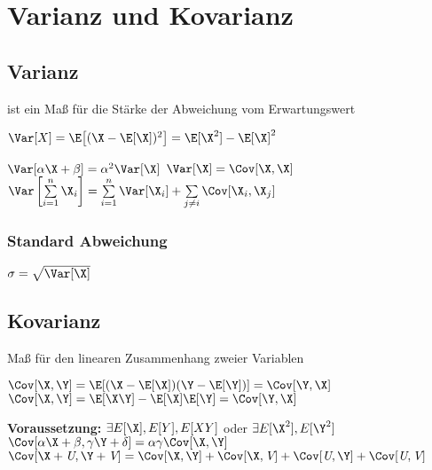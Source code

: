 \documentclass[german,color,6pt]{latex4ei/latex4ei_sheet}
\begin{document}


\section{Varianz und Kovarianz}
\begin{sectionbox}
\subsection{Varianz}
	ist ein Maß für die Stärke der Abweichung vom Erwartungswert
	\begin{emphbox}
		$\Var [X] = \E \big[(\X - \E[\X])^2\big] = \E[\X^2] - \E[\X]^2$
	\end{emphbox}
	$\Var [ \alpha \X + \beta] = \alpha^2 \Var [\X]$ \hfill $\Var [\X] = \Cov [\X,\X]$\\[0.5em]
	$\Var \left[\sum \limits_{i=1}^n \X_i \right] = \sum \limits_{i=1}^{n} \Var [\X_i] + \sum\limits_{j \not= i} \Cov[\X_i, \X_j]$
	\subsubsection{Standard Abweichung}
	$\sigma = \sqrt{\Var[\X]}$
\end{sectionbox}

\begin{sectionbox}
\subsection{Kovarianz}
	Maß für den linearen Zusammenhang zweier Variablen
	\begin{emphbox}
		$\Cov [\X,\Y] = \E[(\X- \E[\X])(\Y - \E[\Y])] = \Cov [\Y, \X]$\\[0.5em]
		$\Cov [\X,\Y] = \E [\X\Y] - \E[\X] \E[\Y] = \Cov[\Y, \X]$
	\end{emphbox}
	\textbf{Voraussetzung:} $\exists E[\X],E[Y],E[XY]$ oder $\exists E[\X^2],E[\Y^2]$\\
	$\Cov [\alpha \X + \beta, \gamma \Y + \delta] = \alpha \gamma \Cov [\X, \Y]$ \\
	$\Cov [ \X + \textit U, \Y + \textit V] = \Cov [\X, \Y] + \Cov [\X, \textit V] + \Cov [\textit U, \Y] + \Cov [\textit U, \textit V]$ \\
\end{sectionbox}
\end{document}

